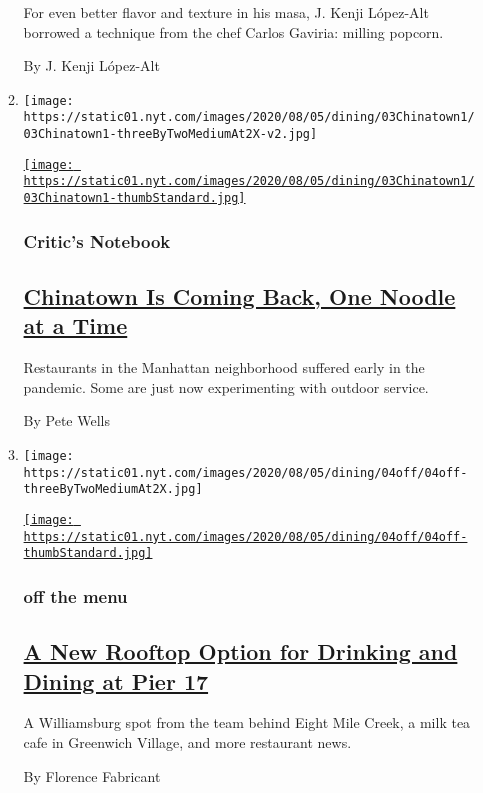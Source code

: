 \begin{enumerate}
\begin{enumerate}
    For even better flavor and texture in his masa, J. Kenji López-Alt
    borrowed a technique from the chef Carlos Gaviria: milling popcorn.

    By J. Kenji López-Alt
  \item
    \texttt{[image: https://static01.nyt.com/images/2020/08/05/dining/03Chinatown1/03Chinatown1-threeByTwoMediumAt2X-v2.jpg]}

    \href{/2020/08/03/dining/chinatown-outdoor-dining-coronavirus.html}{\texttt{[image: https://static01.nyt.com/images/2020/08/05/dining/03Chinatown1/03Chinatown1-thumbStandard.jpg]}}

    \hypertarget{critics-notebook-1}{%
    \subsubsection{Critic's Notebook}\label{critics-notebook-1}}

    \hypertarget{chinatown-is-coming-back-one-noodle-at-a-time}{%
    \subsection{\texorpdfstring{\href{/2020/08/03/dining/chinatown-outdoor-dining-coronavirus.html}{Chinatown
    Is Coming Back, One Noodle at a
    Time}}{Chinatown Is Coming Back, One Noodle at a Time}}\label{chinatown-is-coming-back-one-noodle-at-a-time}}

    Restaurants in the Manhattan neighborhood suffered early in the
    pandemic. Some are just now experimenting with outdoor service.

    By Pete Wells
  \item
    \texttt{[image: https://static01.nyt.com/images/2020/08/05/dining/04off/04off-threeByTwoMediumAt2X.jpg]}

    \href{/2020/08/04/dining/nyc-restaurant-news.html}{\texttt{[image: https://static01.nyt.com/images/2020/08/05/dining/04off/04off-thumbStandard.jpg]}}

    \hypertarget{off-the-menu}{%
    \subsubsection{off the menu}\label{off-the-menu}}

    \hypertarget{a-new-rooftop-option-for-drinking-and-dining-at-pier-17}{%
    \subsection{\texorpdfstring{\href{/2020/08/04/dining/nyc-restaurant-news.html}{A
    New Rooftop Option for Drinking and Dining at Pier
    17}}{A New Rooftop Option for Drinking and Dining at Pier 17}}\label{a-new-rooftop-option-for-drinking-and-dining-at-pier-17}}

    A Williamsburg spot from the team behind Eight Mile Creek, a milk
    tea cafe in Greenwich Village, and more restaurant news.

    By Florence Fabricant
  \end{enumerate}
\end{enumerate}

